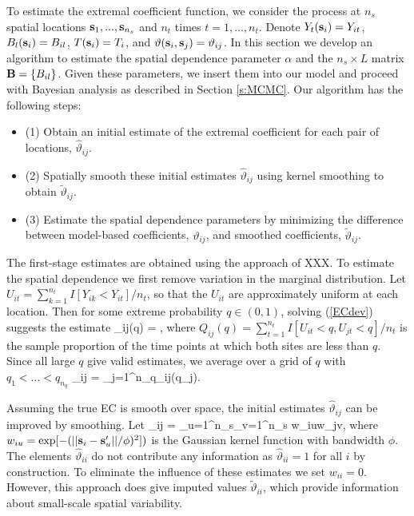 \documentclass[11pt]{article}
\begin{document}
To estimate the extremal coefficient function, we consider the process at $n_s$ spatial locations $\mbox{\bf s}_1,...,\mbox{\bf s}_{n_s}$ and $n_t$ times $t=1,...,n_t$.  Denote $Y_t(\mbox{\bf s}_i) = Y_{it}$, $B_l(\mbox{\bf s}_i) = B_{il}$, $T(\mbox{\bf s}_i)=T_i$, and $\vartheta(\mbox{\bf s}_i,\mbox{\bf s}_j) = \vartheta_{ij}$.  In this section we develop an algorithm to estimate the spatial dependence parameter $\alpha$ and the $n_s\times L$ matrix $\mbox{\bf B} = \{B_{il}\}$.  Given these parameters, we insert them into our model and proceed with Bayesian analysis as described in Section \ref{s:MCMC}.  Our algorithm has the following steps:
\begin{itemize}
  \item[] (1) Obtain an initial estimate of the extremal coefficient for each pair of locations, ${\hat \vartheta}_{ij}$.
  \item[] (2) Spatially smooth these initial estimates ${\hat \vartheta}_{ij}$ using kernel smoothing to obtain ${\tilde \vartheta}_{ij}$.
  \item[] (3) Estimate the spatial dependence parameters by minimizing the difference between model-based coefficients, $\vartheta_{ij}$, and smoothed coefficients, ${\tilde \vartheta}_{ij}$.
\end{itemize}

The first-stage estimates are obtained using the approach of XXX.  To estimate the spatial dependence we first remove variation in the marginal distribution.  Let $U_{it} = \sum_{k=1}^{n_t} I[Y_{ik}<Y_{it}]/n_t$, so that the $U_{it}$ are approximately uniform at each location.  Then for some extreme probability $q\in(0,1)$, solving (\ref{ECdev}) suggests the estimate
\beq\label{EChat0}
   {\hat \vartheta}_{ij}(q) = ,
\eeq
where $Q_{ij}(q) = \sum_{t=1}^{n_t}I[U_{it}<q,U_{jt}<q]/n_t$ is the sample proportion of the time points at which both sites are less than $q$.  Since all large $q$ give valid estimates, we average over a grid of $q$ with $q_1<...<q_{n_q}$
\beq\label{EChat1}
{\hat \vartheta}_{ij} = \sum_{j=1}^{n_q}{\hat \vartheta}_{ij}(q_j).
\eeq

Assuming the true EC is smooth over space, the initial estimates ${\hat \vartheta}_{ij}$ can be improved by smoothing.  Let
\beq\label{EChat2}
  {\tilde \vartheta}_{ij} = 
  {\sum_{u=1}^{n_s}\sum_{v=1}^{n_s} w_{iu}w_{jv}},
\eeq
where $w_{iu} = \exp[-(||\mbox{\bf s}_i-\mbox{\bf s}_u'||/\phi)^2])$ is the Gaussian kernel function with bandwidth $\phi$.  The elements ${\hat \vartheta}_{ii}$ do not contribute any information as ${\hat \vartheta}_{ii}=1$ for all $i$ by construction.  To eliminate the influence of these estimates we set $w_{ii}=0$.  However, this approach does give imputed values ${\tilde \vartheta}_{ii}$, which provide information about small-scale spatial variability.
\end{document}
